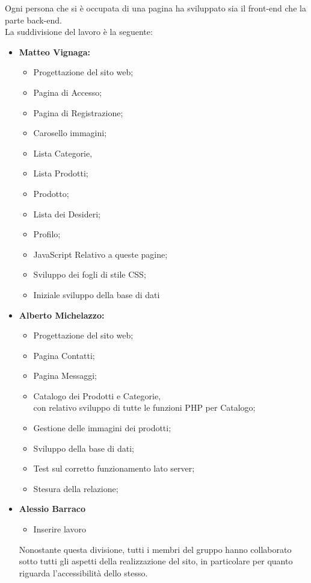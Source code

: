 \documentclass[a4paper, 11pt]{article}
\begin{document}
Ogni persona che si è occupata di una pagina ha sviluppato sia il front-end che la parte back-end. \\
La suddivisione del lavoro è la seguente:

\begin{itemize}
\item \textbf{Matteo Vignaga:}
	\begin{itemize}
		\item Progettazione del sito web;
		\item Pagina di Accesso;
		\item Pagina di Registrazione;
		\item Carosello immagini;
		\item Lista Categorie,
		\item Lista Prodotti;
		\item Prodotto;
		\item Lista dei Desideri;
		\item Profilo;
		\item JavaScript Relativo a queste pagine;
		\item Sviluppo dei fogli di stile CSS;
		\item Iniziale sviluppo della base di dati
	\end{itemize}

\item \textbf{Alberto Michelazzo:}
	\begin{itemize}
		\item Progettazione del sito web;
		\item Pagina Contatti;
		\item Pagina Messaggi;
		\item Catalogo dei Prodotti e Categorie, \\ 
		con relativo sviluppo di tutte le funzioni PHP per Catalogo;
	  	\item Gestione delle immagini dei prodotti;
		\item Sviluppo della base di dati;
		\item Test sul corretto funzionamento lato server;
		\item Stesura della relazione;
	\end{itemize}

\item \textbf{Alessio Barraco}
	\begin{itemize}
	\item Inserire lavoro
	\end{itemize}
	
Nonostante questa divisione, tutti i membri del gruppo hanno collaborato sotto tutti gli aspetti della realizzazione del sito, in particolare per quanto riguarda l'accessibilità dello stesso.
\end{itemize}
\end{document}

